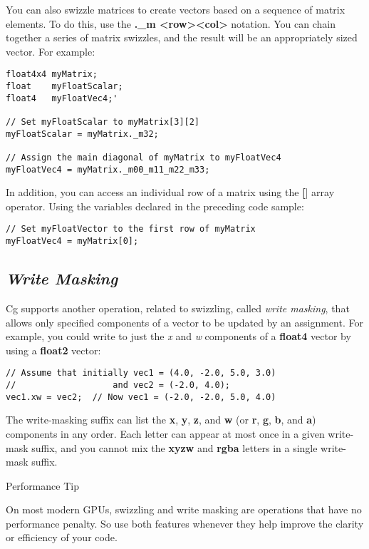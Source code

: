 \documentclass[../main.tex]{subfiles}
\begin{document}
You can also swizzle matrices to create vectors based on a sequence of matrix elements. To do this, use the \textbf{._m <row><col>} notation. You can chain together a series of matrix swizzles, and the result will be an appropriately sized vector. For example:

\FloatBarrier
\begin{lstlisting}
float4x4 myMatrix;
float    myFloatScalar;
float4   myFloatVec4;'

// Set myFloatScalar to myMatrix[3][2]
myFloatScalar = myMatrix._m32;

// Assign the main diagonal of myMatrix to myFloatVec4
myFloatVec4 = myMatrix._m00_m11_m22_m33;
\end{lstlisting}
\FloatBarrier

In addition, you can access an individual row of a matrix using the \textbf{[}] array operator. Using the variables declared in the preceding code sample:

\FloatBarrier
\begin{lstlisting}
// Set myFloatVector to the first row of myMatrix
myFloatVec4 = myMatrix[0];
\end{lstlisting}
\FloatBarrier

\subsection*{\textit{Write Masking}}

Cg supports another operation, related to swizzling, called \textit{write masking}, that allows only specified components of a vector to be updated by an assignment. For example, you could write to just the \textit{x} and \textit{w} components of a \textbf{float4} vector by using a \textbf{float2} vector:

\FloatBarrier
\begin{lstlisting}
// Assume that initially vec1 = (4.0, -2.0, 5.0, 3.0)
//                   and vec2 = (-2.0, 4.0);
vec1.xw = vec2;  // Now vec1 = (-2.0, -2.0, 5.0, 4.0)
\end{lstlisting}
\FloatBarrier

The write-masking suffix can list the \textbf{x}, \textbf{y}, \textbf{z}, and \textbf{w} (or \textbf{r}, \textbf{g}, \textbf{b}, and \textbf{a}) components in any order. Each letter can appear at most once in a given write-mask suffix, and you cannot mix the \textbf{xyzw} and \textbf{rgba} letters in a single write-mask suffix.

\begin{framed}
Performance Tip

On most modern GPUs, swizzling and write masking are operations that have no performance penalty. So use both features whenever they help improve the clarity or efficiency of your code.
\end{framed}
\end{document}
